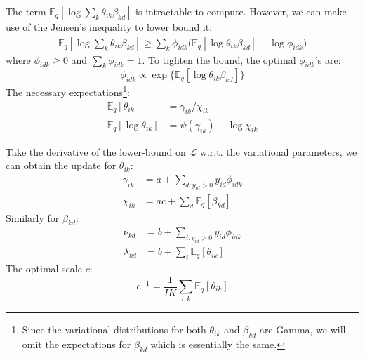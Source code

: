 \documentclass[10pt]{article} %
\begin{document}
The term $\mathbb{E}_q[\log\sum_k \theta_{ik} \beta_{kd}]$ is intractable to compute. However, we can make use of the Jensen's inequality to lower bound it:
\begin{align*}
\mathbb{E}_q[\log\sum_k \theta_{ik} \beta_{kd}] \geq \sum_{k} \phi_{idk} \big(\mathbb{E}_q[\log \theta_{ik} \beta_{kd}] - \log \phi_{idk}\big)
\end{align*}
where $\phi_{idk} \geq 0$ and $\sum_k \phi_{idk} = 1$. To tighten the bound, the optimal $\phi_{idk}$'s are:
\[
\phi_{idk} \propto \exp\{\mathbb{E}_q [\log \theta_{ik} \beta_{kd}]\}
\]
The necessary expectations\footnote{Since the variational distributions for both $\theta_{ik}$ and $\beta_{kd}$ are Gamma, we will omit the expectations for $\beta_{kd}$ which is essentially the same.}:
\begin{align*}
\mathbb{E}_q[\theta_{ik}] &= \gamma_{ik} / \chi_{ik} \\
\mathbb{E}_q[\log \theta_{ik}] &= \psi(\gamma_{ik}) - \log \chi_{ik}
\end{align*}

Take the derivative of the lower-bound on $\mathcal{L}$ w.r.t. the variational parameters, we can obtain the update for $\theta_{ik}$:
\begin{align*}
\gamma_{ik} &= a + \sum_{d: y_{id} > 0} y_{id} \phi_{idk}\\
\chi_{ik} &= ac + \sum_d \mathbb{E}_q[\beta_{kd}]
\end{align*}
Similarly for $\beta_{kd}$:
\begin{align*}
\nu_{kd} &= b + \sum_{i: y_{id} > 0} y_{id} \phi_{idk}\\
\lambda_{kd} &= b + \sum_i \mathbb{E}_q[\theta_{ik}]
\end{align*}
The optimal scale $c$:
\[
c^{-1} = \frac{1}{IK}\sum_{i, k} \mathbb{E}_q [\theta_{ik}]
\]

%
%
\end{document}

